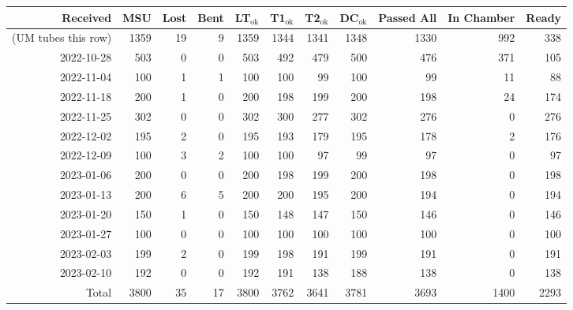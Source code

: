 \begin{tabular}{r|r|r|r|r|r|r|r|r|r|r}
\toprule
           Received &  MSU &  Lost &  Bent &  LT$_\text{ok}$ &  T1$_\text{ok}$ &  T2$_\text{ok}$ &  DC$_\text{ok}$ &  Passed All &  In Chamber &  Ready \\
\midrule
(UM tubes this row) & 1359 &19 & 9 & 1359 & 1344 & 1341 &   1348 & 1330 & 992 &    338 \\
         2022-10-28 &  503 & 0 & 0 & 503 & 492 &  479 &      500 &  476 & 371 &    105 \\
         2022-11-04 &  100 & 1 & 1 & 100 & 100 &   99 &      100 &   99 &  11 &     88 \\
         2022-11-18 &  200 & 1 & 0 & 200 & 198 &  199 &      200 &  198 &  24 &    174 \\
         2022-11-25 &  302 & 0 & 0 & 302 & 300 &  277 &      302 &  276 &   0 &    276 \\
         2022-12-02 &  195 & 2 & 0 & 195 & 193 &  179 &      195 &  178 &   2 &    176 \\
         2022-12-09 &  100 & 3 & 2 & 100 & 100 &   97 &       99 &   97 &   0 &     97 \\
         2023-01-06 &  200 & 0 & 0 & 200 & 198 &  199 &      200 &  198 &   0 &    198 \\
         2023-01-13 &  200 & 6 & 5 & 200 & 200 &  195 &      200 &  194 &   0 &    194 \\
         2023-01-20 &  150 & 1 & 0 & 150 & 148 &  147 &      150 &  146 &   0 &    146 \\
         2023-01-27 &  100 & 0 & 0 & 100 & 100 &  100 &      100 &  100 &   0 &    100 \\
         2023-02-03 &  199 & 2 & 0 & 199 & 198 &  191 &      199 &  191 &   0 &    191 \\
         2023-02-10 &  192 & 0 & 0 & 192 & 191 &  138 &      188 &  138 &   0 &    138 \\
              Total & 3800 &35 &17 & 3800 & 3762 & 3641 &   3781 & 3693 & 1400 & 2293 \\
\bottomrule
\end{tabular}
